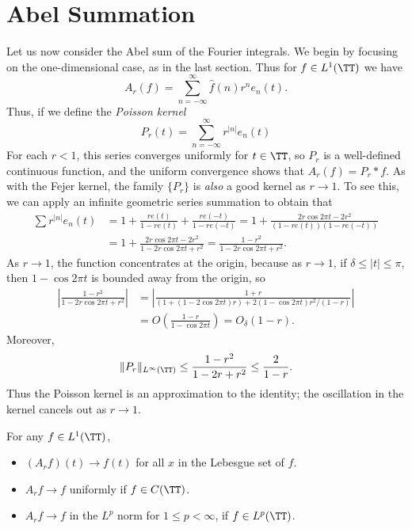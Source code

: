 \section{Abel Summation}

Let us now consider the Abel sum of the Fourier integrals. We begin by focusing on the one-dimensional case, as in the last section. Thus for $f \in L^1(\TT)$ we have
%
\[ A_r(f) = \sum_{n = -\infty}^\infty \widehat{f}(n) r^n e_n(t). \]
%
Thus, if we define the {\it Poisson kernel}
%
\[ P_r(t) = \sum_{n = -\infty}^\infty r^{|n|} e_n(t) \]
%
For each $r < 1$, this series converges uniformly for $t \in \TT$, so $P_r$ is a well-defined continuous function, and the uniform convergence shows that $A_r(f) = P_r * f$. As with the Fejer kernel, the family $\{ P_r \}$ is \emph{also} a good kernel as $r \to 1$. To see this, we can apply an infinite geometric series summation to obtain that
%
\begin{align*}
    \sum r^{|n|} e_n(t) &= 1 + \frac{re(t)}{1 - re(t)} + \frac{re(-t)}{1 - re(-t)} = 1 + \frac{2r \cos 2 \pi t - 2r^2}{(1 - re(t))(1 - re(-t))}\\
    &= 1 + \frac{2r \cos 2\pi t - 2r^2}{1 - 2r \cos 2\pi t + r^2} = \frac{1 - r^2}{1 - 2r \cos 2 \pi t + r^2}.
\end{align*}
%
As $r \to 1$, the function concentrates at the origin, because as $r \to 1$, if $\delta \leq |t| \leq \pi$, then $1 - \cos 2\pi t$ is bounded away from the origin, so
%
\begin{align*}
    \left| \frac{1 - r^2}{1 - 2r \cos 2\pi t + r^2} \right| &= \left| \frac{1 + r}{(1+(1-2\cos 2\pi t)r) + 2(1 - \cos 2\pi t) r^2/(1-r)} \right|\\
    &= O \left( \frac{1 - r}{1 - \cos 2\pi t} \right) = O_\delta(1 - r).
\end{align*}
%
Moreover,
%
\[ \| P_r \|_{L^\infty(\TT)} \leq \frac{1 - r^2}{1 - 2r + r^2} \leq \frac{2}{1 - r}. \]
%
Thus the Poisson kernel is an approximation to the identity; the oscillation in the kernel cancels out as $r \to 1$.

\begin{theorem}
    For any $f \in L^1(\TT)$,
    \begin{itemize}
        \item $(A_r f)(t) \to f(t)$ for all $x$ in the Lebesgue set of $f$.
        \item $A_r f \to f$ uniformly if $f \in C(\TT)$.
        \item $A_r f \to f$ in the $L^p$ norm for $1 \leq p < \infty$, if $f \in L^p(\TT)$.
    \end{itemize}
\end{theorem}

